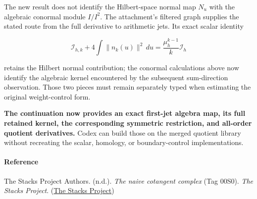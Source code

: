 The new result does not identify the Hilbert-space normal map \(N_u\) with the algebraic conormal
module \(I/I^2\). The attachment's filtered graph supplies the stated route from the full derivative
to arithmetic jets. Its exact scalar identity

\[
\mathcal I_{h,k}
+4\int\|n_k(u)\|^2\,du
=
\frac{\mu_h^{k-1}}{k}\mathcal I_h
\]

retains the Hilbert normal contribution; the conormal calculations above now identify the algebraic
kernel encountered by the subsequent sum-direction observation. Those two pieces must remain
separately typed when estimating the original weight-control form.

\textbf{The continuation now provides an exact first-jet algebra map, its full retained kernel, the
corresponding symmetric restriction, and all-order quotient derivatives.} Codex can build those on
the merged quotient library without recreating the scalar, homology, or boundary-control
implementations.

\paragraph{Reference}\label{conormal_tower_pasted:reference}

The Stacks Project Authors. (n.d.). \emph{The naive cotangent complex} (Tag 00S0). \emph{The Stacks
Project}. (\href{https://stacks.math.columbia.edu/tag/00S0}{The Stacks Project})

